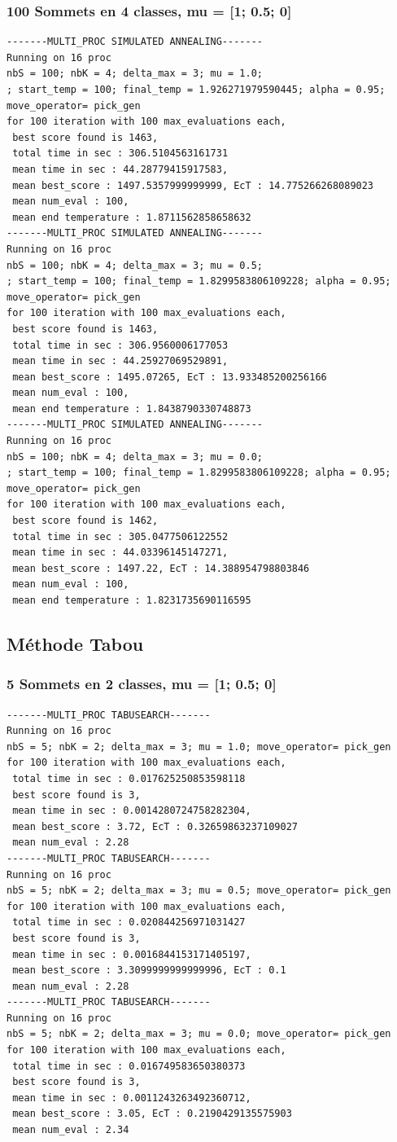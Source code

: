 \documentclass[a4paper]{article}
\begin{document}
\subsubsection{100 Sommets en 4 classes, mu = [1; 0.5; 0]}
\begin{verbatim}
-------MULTI_PROC SIMULATED ANNEALING-------
Running on 16 proc
nbS = 100; nbK = 4; delta_max = 3; mu = 1.0;
; start_temp = 100; final_temp = 1.926271979590445; alpha = 0.95; move_operator= pick_gen
for 100 iteration with 100 max_evaluations each, 
 best score found is 1463,
 total time in sec : 306.5104563161731
 mean time in sec : 44.28779415917583,
 mean best_score : 1497.5357999999999, EcT : 14.775266268089023
 mean num_eval : 100,
 mean end temperature : 1.8711562858658632
-------MULTI_PROC SIMULATED ANNEALING-------
Running on 16 proc
nbS = 100; nbK = 4; delta_max = 3; mu = 0.5;
; start_temp = 100; final_temp = 1.8299583806109228; alpha = 0.95; move_operator= pick_gen
for 100 iteration with 100 max_evaluations each, 
 best score found is 1463,
 total time in sec : 306.9560006177053
 mean time in sec : 44.25927069529891,
 mean best_score : 1495.07265, EcT : 13.933485200256166
 mean num_eval : 100,
 mean end temperature : 1.8438790330748873
-------MULTI_PROC SIMULATED ANNEALING-------
Running on 16 proc
nbS = 100; nbK = 4; delta_max = 3; mu = 0.0;
; start_temp = 100; final_temp = 1.8299583806109228; alpha = 0.95; move_operator= pick_gen
for 100 iteration with 100 max_evaluations each, 
 best score found is 1462,
 total time in sec : 305.0477506122552
 mean time in sec : 44.03396145147271,
 mean best_score : 1497.22, EcT : 14.388954798803846
 mean num_eval : 100,
 mean end temperature : 1.8231735690116595
\end{verbatim}

\subsection{Méthode Tabou}
\subsubsection{5 Sommets en 2 classes, mu = [1; 0.5; 0]}
\begin{verbatim}
-------MULTI_PROC TABUSEARCH-------
Running on 16 proc
nbS = 5; nbK = 2; delta_max = 3; mu = 1.0; move_operator= pick_gen
for 100 iteration with 100 max_evaluations each, 
 total time in sec : 0.017625250853598118
 best score found is 3,
 mean time in sec : 0.0014280724758282304,
 mean best_score : 3.72, EcT : 0.32659863237109027
 mean num_eval : 2.28
-------MULTI_PROC TABUSEARCH-------
Running on 16 proc
nbS = 5; nbK = 2; delta_max = 3; mu = 0.5; move_operator= pick_gen
for 100 iteration with 100 max_evaluations each, 
 total time in sec : 0.020844256971031427
 best score found is 3,
 mean time in sec : 0.0016844153171405197,
 mean best_score : 3.3099999999999996, EcT : 0.1
 mean num_eval : 2.28
-------MULTI_PROC TABUSEARCH-------
Running on 16 proc
nbS = 5; nbK = 2; delta_max = 3; mu = 0.0; move_operator= pick_gen
for 100 iteration with 100 max_evaluations each, 
 total time in sec : 0.016749583650380373
 best score found is 3,
 mean time in sec : 0.0011243263492360712,
 mean best_score : 3.05, EcT : 0.2190429135575903
 mean num_eval : 2.34
\end{verbatim}
\end{document}
